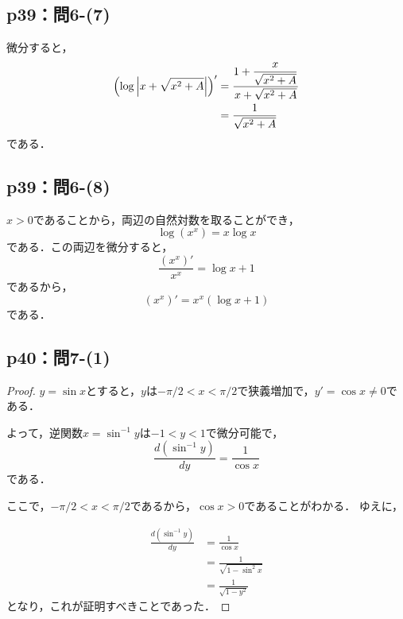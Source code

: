 \documentclass[uplatex,dvipdfmx,a4paper,10pt,fleqn]{jsarticle}
\newenvironment{tleftbar}{\begin{tbleftline}\setlength{\parindent}{1zw}}{\end{tbleftline}}
\begin{document}
    \subsection*{p39：問6-(7)}
    
    \begin{tleftbar}
        微分すると，
        \begin{align*} 
           \left  (\log \abs{x+\sqrt{x^2+A}} \right)' & = \frac{1+\dfrac{x}{\sqrt{x^2+A}}}{x+\sqrt{x^2+A}} \\
            & = \frac{1}{\sqrt{x^2+A}}
        \end{align*}
        である．
    \end{tleftbar}

\subsection*{p39：問6-(8)}

\begin{tleftbar}
$x>0$であることから，両辺の自然対数を取ることができ，
\[
    \log (x^x) = x\log x
\]
である．この両辺を微分すると，
\[
    \frac{(x^x)'}{x^x} = \log x +1
\] 
であるから，
\[
    (x^x)' = x^x (\log x+1)
\]
である．
\end{tleftbar}


\subsection*{p40：問7-(1)}

\begin{tleftbar}
    \begin{proof}
    $y = \sin x$とすると，$y$は$-\pi/2 < x < \pi /2$で狭義増加で，$y' = \cos x \ne 0$である．

    よって，逆関数$x = \sin^{-1} y$は$-1 < y < 1$で微分可能で，
    \[
        \frac{d(\sin^{-1} y)}{dy} = \frac{1}{\cos x}
    \]
    である．

    ここで，$-\pi/2 < x < \pi /2$であるから，$\cos x >0$であることがわかる．
    ゆえに，

    \begin{align*} 
        \frac{d(\sin ^{-1} y)}{dy} &= \frac{1}{\cos x} \\
        & = \frac{1}{\sqrt{1-\sin^2 x}} \\
        & = \frac{1}{\sqrt{1-y^2}}
    \end{align*} 
    となり，これが証明すべきことであった．
\end{proof}
\end{tleftbar}
\end{document}
